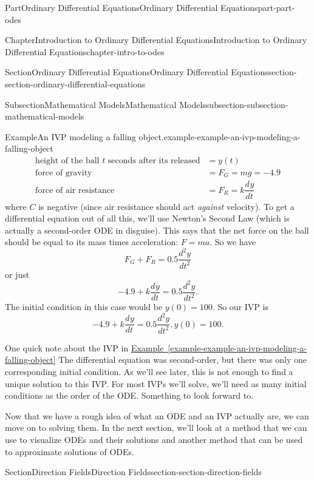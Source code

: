 \documentclass[twoside,10pt,]{book}
\newcommand{\xreffont}{\relax}
\numberwithin{equation}{part}
\newcommand{\dv}[3][]{\dfrac{d^{#1} #2}{d #3^{#1}}}
\begin{document}
\begin{partptx}{Part}{Ordinary Differential Equations}{}{Ordinary Differential Equations}{}{}{part-part-odes}
\begin{chapterptx}{Chapter}{Introduction to Ordinary Differential Equations}{}{Introduction to Ordinary Differential Equations}{}{}{chapter-intro-to-odes}
\begin{sectionptx}{Section}{Ordinary Differential Equations}{}{Ordinary Differential Equations}{}{}{section-section-ordinary-differential-equations}
\begin{subsectionptx}{Subsection}{Mathematical Models}{}{Mathematical Models}{}{}{subsection-subsection-mathematical-models}
\begin{example}{Example}{An IVP modeling a falling object.}{example-example-an-ivp-modeling-a-falling-object}
\begin{align*}
\text{height of the ball }t\text{ seconds after its released} &= y(t) \\
\text{force of gravity} &= F_{G} = mg = -4.9\\
\text{force of air resistance} &= F_{R} = k\dv{y}{t} 
\end{align*}
where \(C\) is negative (since air resistance should act \emph{against} velocity). To get a differential equation out of all this, we'll use Newton's Second Law (which is actually a second-order ODE in disguise). This says that the net force on the ball should be equal to its mass times acceleration: \(F = ma\). So we have%
\begin{equation*}
F_{G}+F_{R} = 0.5\dv[2]{y}{t}
\end{equation*}
or just%
\begin{equation*}
-4.9+k\dv{y}{t} = 0.5\dv[2]{y}{t}.
\end{equation*}
The initial condition in this case would be \(y(0) = 100\). So our IVP is%
\begin{equation*}
-4.9+k\dv{y}{t} = 0.5\dv[2]{y}{t}, y(0) = 100.
\end{equation*}
%
\end{example}
One quick note about the IVP in \hyperref[example-example-an-ivp-modeling-a-falling-object]{Example~{\xreffont\ref{example-example-an-ivp-modeling-a-falling-object}}} The differential equation was second-order, but there was only one corresponding initial condition. As we'll see later, this is not enough to find a unique solution to this IVP. For most IVPs we'll solve, we'll need as many initial conditions as the order of the ODE. Something to look forward to.%
\end{subsectionptx}
\begin{conclusion}{}%
Now that we have a rough idea of what an ODE and an IVP actually are, we can move on to solving them. In the next section, we'll look at a method that we can use to visualize ODEs and their solutions and another method that can be used to approximate solutions of ODEs.%
\end{conclusion}%
\end{sectionptx}
%
%
\typeout{************************************************}
\typeout{************************************************}
%
\begin{sectionptx}{Section}{Direction Fields}{}{Direction Fields}{}{}{section-section-direction-fields}
\begin{introduction}{}%

\end{introduction}
\end{sectionptx}
\end{chapterptx}
\end{partptx}
\end{document}
